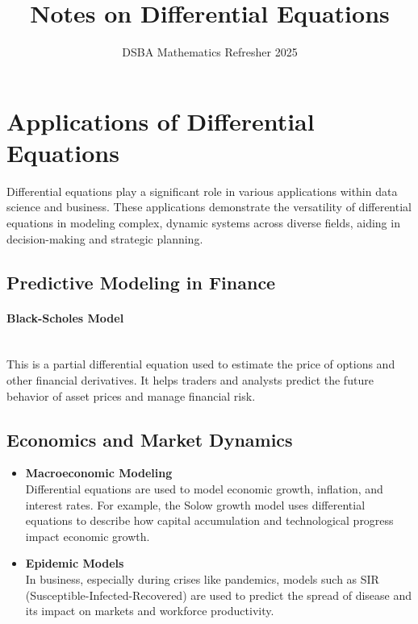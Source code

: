 \documentclass[]{article}
\title{Notes on Differential Equations}
\author{DSBA Mathematics Refresher 2025}
\date{}
\begin{document}
	
	\maketitle
	
	\begin{abstract}
		
	\end{abstract}
	
	\section{Applications of Differential Equations}
	Differential equations play a significant role in various applications within data science and business. These applications demonstrate the versatility of differential equations in modeling complex, dynamic systems across diverse fields, aiding in decision-making and strategic planning.
	\subsection{Predictive Modeling in Finance}
	\paragraph{Black-Scholes Model}\noindent\\
	This is a partial differential equation used to estimate the price of options and other financial derivatives.
	It helps traders and analysts predict the future behavior of asset prices and manage financial risk.
	\subsection{Economics and Market Dynamics}
	\begin{itemize}
		\item \textbf{Macroeconomic Modeling}\noindent\\
		Differential equations are used to model economic growth, inflation, and interest rates.
		For example, the Solow growth model uses differential equations to describe how capital accumulation and technological progress impact economic growth.
		\item \textbf{Epidemic Models}\\
		In business, especially during crises like pandemics, models such as SIR (Susceptible-Infected-Recovered) are used to predict the spread of disease and its impact on markets and workforce productivity.
	\end{itemize}
\end{document}

